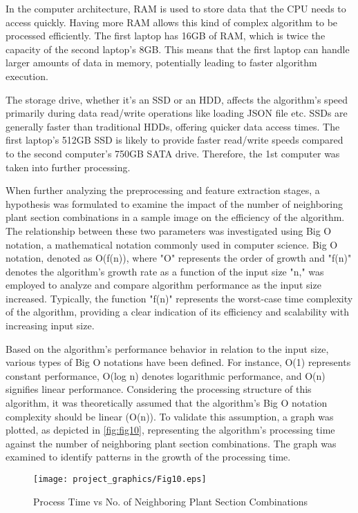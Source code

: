 \documentclass[]{iat}
\begin{document}
In the computer architecture, RAM is used to store data that the CPU needs to access quickly. Having more RAM allows this kind of complex algorithm to be processed efficiently. The first laptop has 16GB of RAM, which is twice the capacity of the second laptop's 8GB. This means that the first laptop can handle larger amounts of data in memory, potentially leading to faster algorithm execution.
\par
The storage drive, whether it's an SSD or an HDD, affects the algorithm's speed primarily during data read/write operations like loading JSON file etc. SSDs are generally faster than traditional HDDs, offering quicker data access times. The first laptop's 512GB SSD is likely to provide faster read/write speeds compared to the second computer's 750GB SATA drive. Therefore, the 1st computer was taken into further processing. 
\par
When further analyzing the preprocessing and feature extraction stages, a hypothesis was formulated to examine the impact of the number of neighboring plant section combinations in a sample image on the efficiency of the algorithm. The relationship between these two parameters was investigated using Big O notation, a mathematical notation commonly used in computer science. Big O notation, denoted as O(f(n)), where "O" represents the order of growth and "f(n)" denotes the algorithm's growth rate as a function of the input size "n," was employed to analyze and compare algorithm performance as the input size increased. Typically, the function "f(n)" represents the worst-case time complexity of the algorithm, providing a clear indication of its efficiency and scalability with increasing input size.
\par
Based on the algorithm's performance behavior in relation to the input size, various types of Big O notations have been defined. For instance, O(1) represents constant performance, O(log n) denotes logarithmic performance, and O(n) signifies linear performance. Considering the processing structure of this algorithm, it was theoretically assumed that the algorithm's Big O notation complexity should be linear (O(n)). To validate this assumption, a graph was plotted, as depicted in \autoref{fig:fig10}, representing the algorithm's processing time against the number of neighboring plant section combinations. The graph was examined to identify patterns in the growth of the processing time.
\par
\FloatBarrier
\begin{figure}[h]
	\texttt{[image: project\_graphics/Fig10.eps]}
	\caption{Process Time vs No. of Neighboring Plant Section Combinations }
	\label{fig:fig10}
\end{figure}
\end{document}
